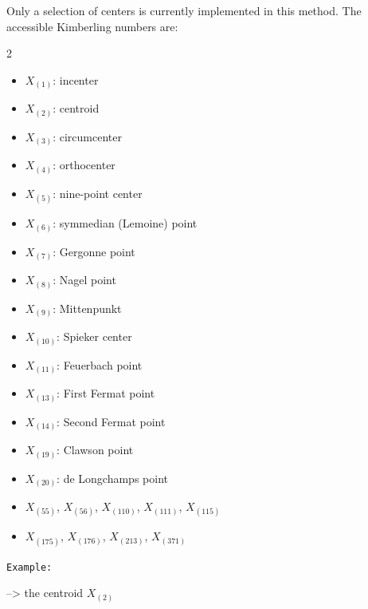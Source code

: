 Only a selection of centers is currently implemented in this method. The accessible Kimberling numbers are:
\begin{multicols}{2}
\begin{itemize}
  \item $X_{(1)}$: incenter
  \item $X_{(2)}$: centroid
  \item $X_{(3)}$: circumcenter
  \item $X_{(4)}$: orthocenter
  \item $X_{(5)}$: nine-point center
  \item $X_{(6)}$: symmedian (Lemoine) point
  \item $X_{(7)}$: Gergonne point
  \item $X_{(8)}$: Nagel point
  \item $X_{(9)}$: Mittenpunkt
  \item $X_{(10)}$: Spieker center
  \item $X_{(11)}$: Feuerbach point
  \item $X_{(13)}$: First Fermat point
  \item $X_{(14)}$: Second Fermat point
  \item $X_{(19)}$: Clawson point
  \item $X_{(20)}$: de Longchamps point
  \item $X_{(55)}$, $X_{(56)}$, $X_{(110)}$, $X_{(111)}$, $X_{(115)}$
  \item $X_{(175)}$, $X_{(176)}$, $X_{(213)}$, $X_{(371)}$
\end{itemize}
\end{multicols}


\texttt{Example:}
\begin{mybox}
 \quad --> the centroid $X_{(2)}$
\end{mybox}

\vspace{1em}

\begin{tkzexample}[latex=.5\textwidth]
\begin{center}
\end{center}
\end{tkzexample}

